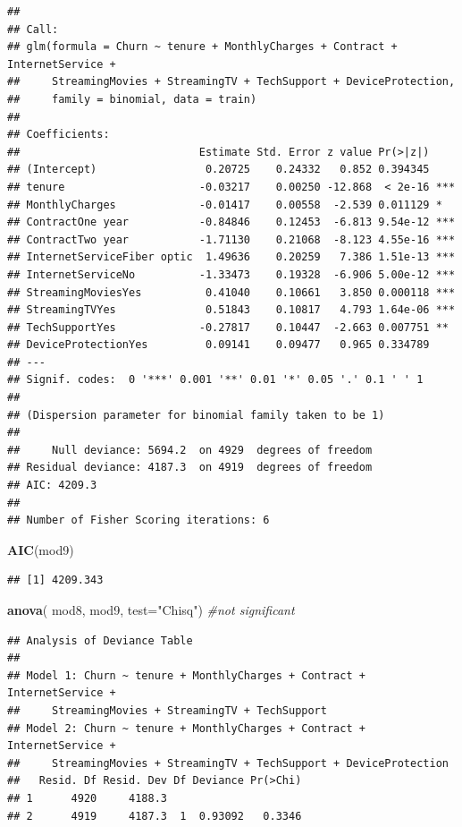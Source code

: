 \documentclass[
  twoside]{article}
\newenvironment{Shaded}{\begin{snugshade}}{\end{snugshade}}
\newcommand{\AttributeTok}[1]{\textcolor[rgb]{0.13,0.29,0.53}{#1}}
\newcommand{\CommentTok}[1]{\textcolor[rgb]{0.56,0.35,0.01}{\textit{#1}}}
\newcommand{\FunctionTok}[1]{\textcolor[rgb]{0.13,0.29,0.53}{\textbf{#1}}}
\newcommand{\NormalTok}[1]{#1}
\newcommand{\StringTok}[1]{\textcolor[rgb]{0.31,0.60,0.02}{#1}}
\begin{document}
\begin{verbatim}
## 
## Call:
## glm(formula = Churn ~ tenure + MonthlyCharges + Contract + InternetService + 
##     StreamingMovies + StreamingTV + TechSupport + DeviceProtection, 
##     family = binomial, data = train)
## 
## Coefficients:
##                            Estimate Std. Error z value Pr(>|z|)    
## (Intercept)                 0.20725    0.24332   0.852 0.394345    
## tenure                     -0.03217    0.00250 -12.868  < 2e-16 ***
## MonthlyCharges             -0.01417    0.00558  -2.539 0.011129 *  
## ContractOne year           -0.84846    0.12453  -6.813 9.54e-12 ***
## ContractTwo year           -1.71130    0.21068  -8.123 4.55e-16 ***
## InternetServiceFiber optic  1.49636    0.20259   7.386 1.51e-13 ***
## InternetServiceNo          -1.33473    0.19328  -6.906 5.00e-12 ***
## StreamingMoviesYes          0.41040    0.10661   3.850 0.000118 ***
## StreamingTVYes              0.51843    0.10817   4.793 1.64e-06 ***
## TechSupportYes             -0.27817    0.10447  -2.663 0.007751 ** 
## DeviceProtectionYes         0.09141    0.09477   0.965 0.334789    
## ---
## Signif. codes:  0 '***' 0.001 '**' 0.01 '*' 0.05 '.' 0.1 ' ' 1
## 
## (Dispersion parameter for binomial family taken to be 1)
## 
##     Null deviance: 5694.2  on 4929  degrees of freedom
## Residual deviance: 4187.3  on 4919  degrees of freedom
## AIC: 4209.3
## 
## Number of Fisher Scoring iterations: 6
\end{verbatim}

\begin{Shaded}
\begin{Highlighting}[]
\FunctionTok{AIC}\NormalTok{(mod9)}
\end{Highlighting}
\end{Shaded}

\begin{verbatim}
## [1] 4209.343
\end{verbatim}

\begin{Shaded}
\begin{Highlighting}[]
\FunctionTok{anova}\NormalTok{( mod8, mod9,  }\AttributeTok{test=}\StringTok{"Chisq"}\NormalTok{) }\CommentTok{\#not significant}
\end{Highlighting}
\end{Shaded}

\begin{verbatim}
## Analysis of Deviance Table
## 
## Model 1: Churn ~ tenure + MonthlyCharges + Contract + InternetService + 
##     StreamingMovies + StreamingTV + TechSupport
## Model 2: Churn ~ tenure + MonthlyCharges + Contract + InternetService + 
##     StreamingMovies + StreamingTV + TechSupport + DeviceProtection
##   Resid. Df Resid. Dev Df Deviance Pr(>Chi)
## 1      4920     4188.3                     
## 2      4919     4187.3  1  0.93092   0.3346
\end{verbatim}
\end{document}
